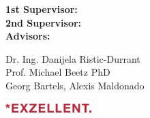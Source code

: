 \begin{titlepage}
\vfill

\begin{minipage}{0.2\linewidth}
\begin{flushleft}
\small \textbf{1st Supervisor:} \\
\small \textbf{2nd Supervisor:} \\
\small \textbf{Advisors:} \\
\end{flushleft}
\end{minipage}
\hfill
\begin{minipage}{0.7\linewidth}
\begin{flushleft}
\small Dr. Ing. Danijela Ristic-Durrant \\
\small Prof. Michael Beetz PhD \\
\small  Georg Bartels, Alexis Maldonado\\
\end{flushleft}
\end{minipage}

\vspace{1.2cm}

\begin{flushleft}
\includegraphics[width=0.25\textwidth]{bilder/EXZELLENT_logo.png}
\end{flushleft}

\vspace{1cm}

\newpage

\end{titlepage}


